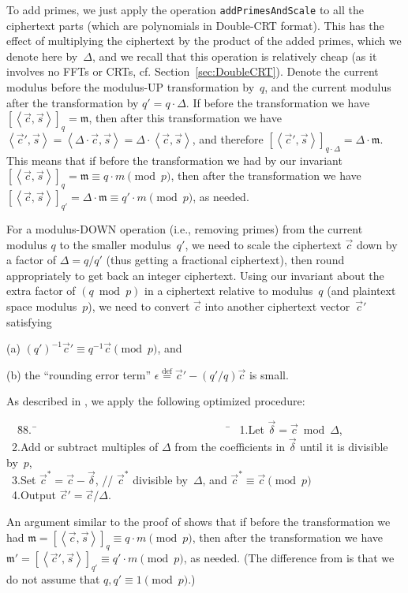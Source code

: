 \documentclass[14pt]{extarticle}
\newcommand{\secref}[1]{Section~\protect\ref{sec:#1}}
\newcommand{\grp}[1]{\left\langle #1 \right\rangle}
\def\eqdef{\stackrel{\mathrm{def}}{=}}
\def\vc{\vec{c}}
\def\vs{\vec{s}}
\newcommand{\mm}{\mathfrak{m}}
\begin{document}
To add primes, we just apply the operation \texttt{addPrimesAndScale}
to all the ciphertext parts (which are polynomials in Double-CRT
format). This has the effect of multiplying the ciphertext by the
product of the added primes, which we denote here by~$\Delta$, and
we recall that this operation is relatively cheap (as it involves no
FFTs or CRTs, cf. \secref{DoubleCRT}). Denote the current modulus
before the modulus-UP transformation by~$q$, and the current modulus
after the transformation by $q'=q\cdot\Delta$. If before the
transformation we have $[\grp{\vc,\vs}]_q=\mm$, then after this
transformation we have $\grp{\vc',\vs}=\grp{\Delta\cdot\vc,\vs}=\Delta
\cdot\grp{\vc,\vs}$, and therefore $[\grp{\vc',\vs}]_{q\cdot\Delta}=
\Delta\cdot\mm$. This means that if before the transformation we had
by our invariant $[\grp{\vc,\vs}]_q=\mm\equiv q \cdot m \pmod{p}$,
then after the transformation we have $[\grp{\vc,\vs}]_{q'}=\Delta
\cdot\mm\equiv q'\cdot m \pmod{p}$, as needed.

For a modulus-DOWN operation (i.e., removing primes) from the current
modulus $q$ to the smaller modulus~$q'$, we need to scale the
ciphertext $\vc$ down by a factor of $\Delta=q/q'$ (thus getting
a fractional ciphertext), then round appropriately to get back an
integer ciphertext. Using our invariant about the extra factor of
$(q \bmod p)$ in a ciphertext relative to modulus~$q$ (and plaintext
space modulus~$p$), we need to convert $\vc$ into another ciphertext
vector~$\vc'$ satisfying

 (a) $(q')^{-1}\vc'\equiv q^{-1}\vc\pmod p$, and

 (b) the ``rounding error term'' $\epsilon\eqdef\vc'-(q'/q)\vc$ is small.

\smallskip\noindent
As described in \cite{GHS12c}, we apply the following optimized
procedure:

\vspace{-1ex}
\begin{tabbing}
~~\=88.~\=~~~~~~~~~~~~~~~~~~~~~~~~~~~~~~~~~~~\=\kill
\>~1.\>Let $\vec{\delta}=\vc\bmod\Delta$,\\
\>~2.\>Add or subtract multiples of $\Delta$ from the coefficients in
  $\vec{\delta}$ until it is divisible by~$p$,\\
\>~3.\>Set $\vc^*=\vc-\vec{\delta}$, \>// 
   $\vc^*$ divisible by~$\Delta$, and $\vc^*\equiv\vc\pmod{p}$\\
\>~4.\>Output $\vc'=\vc/\Delta$.
\end{tabbing}

An argument similar to the proof of \cite[Lemma~4]{BGV12} shows
that if before the transformation we had $\mm=[\grp{\vc,\vs}]_q
\equiv q\cdot m \pmod{p}$, then after the transformation we have
$\mm'=[\grp{\vc',\vs}]_{q'}\equiv q'\cdot m \pmod{p}$, as needed.
(The difference from \cite[Lemma~4]{BGV12} is that we do not assume
that $q,q'\equiv 1\pmod{p}$.)
\end{document}
